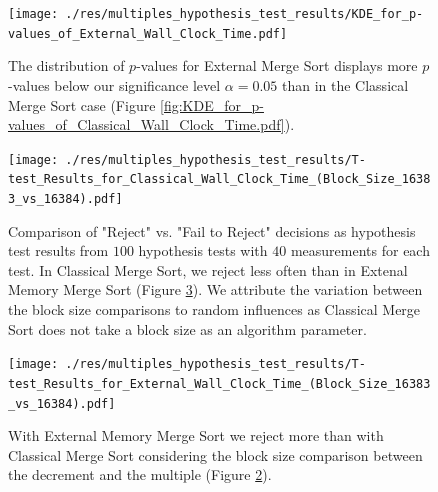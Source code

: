\documentclass[twocolumn]{article}
\begin{document}
\begin{figure}[htb]
	\begin{minipage}{0.475 \textwidth}
	\centering
	\texttt{[image: ./res/multiples\_hypothesis\_test\_results/KDE\_for\_p-values\_of\_External\_Wall\_Clock\_Time.pdf]}
	\caption{The distribution of \( p \)-values for External Merge Sort displays more \( p \)-values below our significance level \( \alpha = 0.05 \) than in the Classical Merge Sort case (Figure \ref{fig:KDE_for_p-values_of_Classical_Wall_Clock_Time.pdf}).}
	\label{fig:KDE_for_p-values_of_External_Wall_Clock_Time.pdf}
	\end{minipage}
\end{figure}

\begin{figure}[htb]
	\begin{minipage}{0.475 \textwidth}
	\centering
	\texttt{[image: ./res/multiples\_hypothesis\_test\_results/T-test\_Results\_for\_Classical\_Wall\_Clock\_Time\_(Block\_Size\_16383\_vs\_16384).pdf]}
	\caption{Comparison of "Reject" vs. "Fail to Reject" decisions as hypothesis test results from \( 100 \) hypothesis tests with \( 40 \) measurements for each test. 
	In Classical Merge Sort, we reject less often than in Extenal Memory Merge Sort (Figure \ref{fig:T-test_Results_for_External_Wall_Clock_Time_(Block_Size_16383_vs_16384).pdf}). 
	We attribute the variation between the block size comparisons to random influences as Classical Merge Sort does not take a block size as an algorithm parameter.}
	\label{fig:T-test_Results_for_Classical_Wall_Clock_Time_(Block_Size_16383_vs_16384).pdf}
	\end{minipage}
\end{figure}

\begin{figure}[htb]
	\begin{minipage}{0.475 \textwidth}
	\centering
	\texttt{[image: ./res/multiples\_hypothesis\_test\_results/T-test\_Results\_for\_External\_Wall\_Clock\_Time\_(Block\_Size\_16383\_vs\_16384).pdf]}
	\caption{With External Memory Merge Sort we reject more than with Classical Merge Sort considering the block size comparison between the decrement and the multiple (Figure \ref{fig:T-test_Results_for_Classical_Wall_Clock_Time_(Block_Size_16383_vs_16384).pdf}).}
	\label{fig:T-test_Results_for_External_Wall_Clock_Time_(Block_Size_16383_vs_16384).pdf}
	\end{minipage}
\end{figure}
\end{document}
